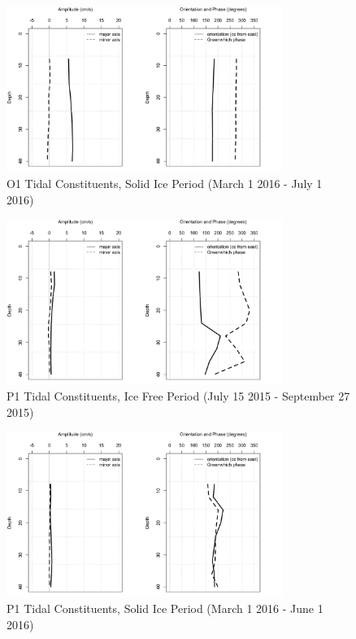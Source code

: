 \documentclass[12pt]{dforeport}
\begin{document}
\begin{figure}  
\centering
\includegraphics[width = 0.8\textwidth]{./figures/60_O1TC_si_2015.png}
\caption[O1 Tidal Constituents, Solid Ice, 2015]{O1 Tidal Constituents, Solid Ice Period (March 1 2016 - July 1 2016)}
\label{f:o1_si_2015}
\end{figure}


\begin{figure}  
\centering
\includegraphics[width = 0.8\textwidth]{./figures/61_P1TC_if_2015.png}
\caption[P1 Tidal Constituents, Ice free, 2015]{P1 Tidal Constituents, Ice Free Period (July 15 2015 - September 27 2015)}
\label{f:p1_if_2015}
\end{figure}

\begin{figure}  
\centering
\includegraphics[width = 0.8\textwidth]{./figures/62_P1TC_si_2015.png}
\caption[P1 Tidal Constituents, Solid Ice, 2015]{P1 Tidal Constituents, Solid Ice Period (March 1 2016 - June 1 2016)}
\label{f:p1_si_2015}
\end{figure}
\end{document}
